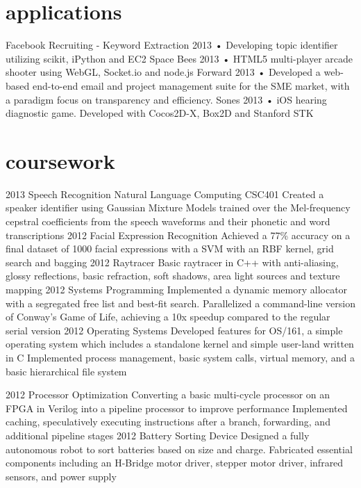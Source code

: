 \documentclass[]{friggeri-cv}
\begin{document}
\section{applications}

\begin{entrylist}
  \entry
    {Facebook Recruiting - Keyword Extraction}
    {}
    {2013}
    {• Developing topic identifier utilizing scikit, iPython and EC2}
  \entry
    {Space Bees}
    {}
    {2013}
    {• HTML5 multi-player arcade shooter using WebGL, Socket.io and node.js}
  \entry
    {Forward}
    {}
    {2013}
    {• Developed a web-based end-to-end email and project management suite for the SME market, with a paradigm focus on transparency and efficiency.}
  \entry
    {Sones}
    {}
    {2013}
    {• iOS hearing diagnostic game. Developed with Cocos2D-X, Box2D and Stanford STK}
\end{entrylist}

\newpage

\section{coursework}

\begin{entrylist}
  \entry
    {2013}
    {Speech Recognition}
    {Natural Language Computing CSC401}
    {Created a speaker identifier using Gaussian Mixture Models trained over the Mel-frequency cepstral  coefficients from the speech waveforms  and their phonetic and word transcriptions}
  \entry
    {2012}
    {Facial Expression Recognition}
    {}
    {Achieved a 77\% accuracy on a final dataset of 1000 facial expressions with a SVM with an RBF kernel, grid search and bagging}
  \entry
    {2012}
    {Raytracer}
    {}
    {Basic raytracer in C++ with anti-aliasing, glossy reflections, basic refraction, soft shadows, area light sources and texture mapping}
  \entry
    {2012}
    {Systems Programming}
    {}
    {Implemented a dynamic memory allocator with a segregated free list and best-fit search. Parallelized a command-line version of Conway’s Game of Life, achieving a 10x speedup compared to the regular serial version}
  \entry
    {2012}
    {Operating Systems}
    {}
    {Developed  features  for OS/161, a simple operating  system  which includes a standalone kernel and simple user-land  written in C
    Implemented process management, basic system  calls, virtual memory, and a basic hierarchical file system}
    
  \entry
    {2012}
    {Processor Optimization}
    {}
    {Converting a basic multi-cycle processor on an FPGA in Verilog into a pipeline processor to improve performance
    Implemented caching, speculatively executing instructions after a branch, forwarding, and additional pipeline stages}
  \entry
    {2012}
    {Battery Sorting Device}
    {}
    {Designed a fully autonomous robot to sort batteries based on size and charge. Fabricated  essential components including an H-Bridge motor driver, stepper motor driver, infrared sensors, and power supply}
\end{entrylist}
\end{document}

